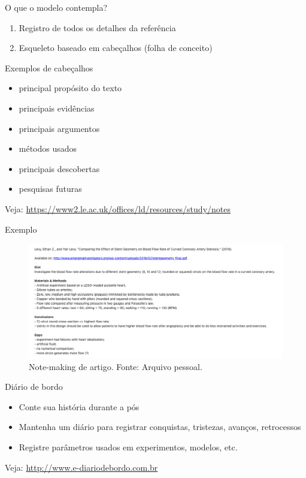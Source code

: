 \begin{frame}{O que o modelo contempla?}
\begin{enumerate}
\item Registro de todos os detalhes da referência
\item Esqueleto baseado em cabeçalhos (folha de conceito)
\end{enumerate}
\end{frame}

\begin{frame}{Exemplos de cabeçalhos}
\begin{itemize}
\item principal propósito do texto
\item principais evidências
\item principais argumentos
\item métodos usados
\item principais descobertas
\item pesquisas futuras
\end{itemize}
\scriptsize{Veja: \url{https://www2.le.ac.uk/offices/ld/resources/study/notes}}
\end{frame}

\begin{frame}{Exemplo}
\begin{figure}
\centering
\includegraphics[scale=0.3]{figs/02/note-making}
\caption{Note-making de artigo. Fonte: Arquivo pessoal.}
\end{figure}
\end{frame}

\begin{frame}{Diário de bordo}
\begin{itemize}
\item Conte sua história durante a pós
\item Mantenha um diário para registrar conquistas, tristezas, avanços, retrocessos
\item Registre parâmetros usados em experimentos, modelos, etc. 
\end{itemize}
\scriptsize{Veja: \url{http://www.e-diariodebordo.com.br}}
\end{frame}

